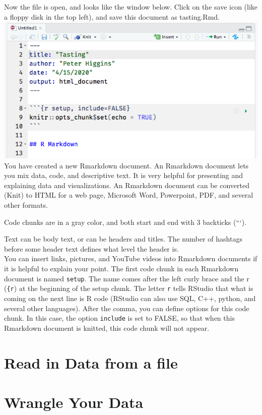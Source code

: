\documentclass[
]{book}
\begin{document}
Now the file is open, and looks like the window below. Click on the save icon (like a floppy disk in the top left), and save this document as tasting.Rmd.
\includegraphics{images/rmd3.png}
You have created a new Rmarkdown document. An Rmarkdown document lets you mix data, code, and descriptive text. It is very helpful for presenting and explaining data and visualizations. An Rmarkdown document can be converted (Knit) to HTML for a web page, Microsoft Word, Powerpoint, PDF, and several other formats.

Code chunks are in a gray color, and both start and end with 3 backticks (```).

Text can be body text, or can be headers and titles. The number of hashtags before some header text defines what level the header is.\\
You can insert links, pictures, and YouTube videos into Rmarkdown documents if it is helpful to explain your point.
The first code chunk in each Rmarkdown document is named \texttt{setup}. The name comes after the left curly brace and the r (\texttt{\{r}) at the beginning of the setup chunk. The letter \texttt{r} tells RStudio that what is coming on the next line is R code (RStudio can also use SQL, C++, python, and several other languages). After the comma, you can define options for this code chunk. In this case, the option \texttt{include} is set to FALSE, so that when this Rmarkdown document is knitted, this code chunk will not appear.

\hypertarget{read-in-data-from-a-file}{%
\section{Read in Data from a file}\label{read-in-data-from-a-file}}

\hypertarget{wrangle-your-data}{%
\section{Wrangle Your Data}\label{wrangle-your-data}}
\end{document}
